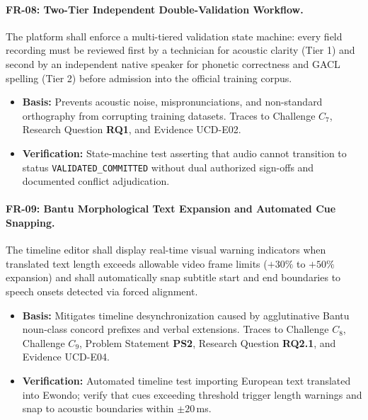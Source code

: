 \documentclass[a4paper,11pt]{article}
\begin{document}
\paragraph{FR-08: Two-Tier Independent Double-Validation Workflow.}
The platform shall enforce a multi-tiered validation state machine: every field recording must be reviewed first by a technician for acoustic clarity (Tier 1) and second by an independent native speaker for phonetic correctness and GACL spelling (Tier 2) before admission into the official training corpus.
\begin{itemize}
    \item \textbf{Basis:} Prevents acoustic noise, mispronunciations, and non-standard orthography from corrupting training datasets. Traces to Challenge $C_7$, Research Question \textbf{RQ1}, and Evidence UCD-E02.
    \item \textbf{Verification:} State-machine test asserting that audio cannot transition to status \texttt{VALIDATED\_COMMITTED} without dual authorized sign-offs and documented conflict adjudication.
\end{itemize}

\paragraph{FR-09: Bantu Morphological Text Expansion and Automated Cue Snapping.}
The timeline editor shall display real-time visual warning indicators when translated text length exceeds allowable video frame limits ($+30\%$ to $+50\%$ expansion) and shall automatically snap subtitle start and end boundaries to speech onsets detected via forced alignment.
\begin{itemize}
    \item \textbf{Basis:} Mitigates timeline desynchronization caused by agglutinative Bantu noun-class concord prefixes and verbal extensions. Traces to Challenge $C_8$, Challenge $C_9$, Problem Statement \textbf{PS2}, Research Question \textbf{RQ2.1}, and Evidence UCD-E04.
    \item \textbf{Verification:} Automated timeline test importing European text translated into Ewondo; verify that cues exceeding threshold trigger length warnings and snap to acoustic boundaries within $\pm 20$\,ms.
\end{itemize}
\end{document}
